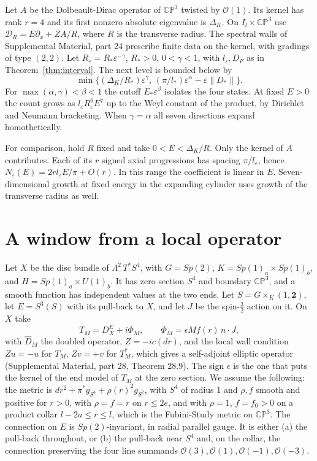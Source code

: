 \documentclass[aps,prd,reprint,onecolumn,nofootinbib,amsmath,amssymb,floatfix]{revtex4-2}
\theoremstyle{plain}
\newcommand{\CP}{\mathbb{CP}}
\newcommand{\hatD}{\widehat D}
\newcommand{\supp}[1]{Supplemental Material, part #1}
\begin{document}
Let $A$ be the Dolbeault-Dirac operator of $\CP^3$ twisted by $\mathcal O(1)$. Its kernel has rank $r=4$ and its first nonzero absolute eigenvalue is $\Delta_K$. On $I_l\times\CP^3$ use $\mathcal D_R=E\partial_x+ZA/R$, where $R$ is the transverse radius. The spectral walls of \supp{24} prescribe finite data on the kernel, with gradings of type $(2,2)$. Let $R_\varepsilon=R_*\varepsilon^{-\gamma}$, $R_*>0$, $0<\gamma<1$, with $l_\varepsilon,D_F$ as in Theorem~\ref{thm:interval}. The next level is bounded below by
\begin{equation}
\min\{(\Delta_K/R_*)\varepsilon^\gamma,\,
       (\pi/l_*)\varepsilon^\alpha-\varepsilon\|D_*\|\}.
\end{equation}
For $\max(\alpha,\gamma)<\beta<1$ the cutoff $E_*\varepsilon^\beta$ isolates the four states. At fixed $E>0$ the count grows as $l_\varepsilon R_\varepsilon^6 E^7$ up to the Weyl constant of the product, by Dirichlet and Neumann bracketing. When $\gamma=\alpha$ all seven directions expand homothetically.

For comparison, hold $R$ fixed and take $0<E<\Delta_K/R$. Only the kernel of $A$ contributes. Each of its $r$ signed axial progressions has spacing $\pi/l_\varepsilon$, hence $N_\varepsilon(E)=2r l_\varepsilon E/\pi+O(r)$. In this range the coefficient is linear in $E$. Seven-dimensional growth at fixed energy in the expanding cylinder uses growth of the transverse radius as well.

\section{A window from a local operator}\label{sec:window}

Let $X$ be the disc bundle of $\Lambda^2_-T^*S^4$, with $G=Sp(2)$, $K=Sp(1)_a\times Sp(1)_b$, and $H=Sp(1)_a\times U(1)_b$. It has zero section $S^4$ and boundary $\CP^3$, and a smooth function has independent values at the two ends. Let $S=G\times_K(1,\mathbf 2)$, let $E=S^3(S)$ with its pull-back to $X$, and let $J$ be the spin-$\frac32$ action on it. On $X$ take
\begin{equation}
T_M=D_X^E+i\Phi_M,\qquad\Phi_M=\epsilon Mf(r)\,n\cdot J,
\end{equation}
with $\hatD_M$ the doubled operator, $Z=-ic(dr)$, and the local wall condition $Zu=-u$ for $T_M$, $Zv=+v$ for $T_M^*$, which gives a self-adjoint elliptic operator (\supp{28}, Theorem 28.9). The sign $\epsilon$ is the one that puts the kernel of the end model of $T_M$ at the zero section. We assume the following: the metric is $dr^2+\pi^*g_{S^4}+\rho(r)^2g_{S^2}$, with $S^4$ of radius $1$ and $\rho,f$ smooth and positive for $r>0$, with $\rho=f=r$ on $r\le2e$, and with $\rho=1$, $f=f_0>0$ on a product collar $l-2a\le r\le l$, which is the Fubini-Study metric on $\CP^3$. The connection on $E$ is $Sp(2)$-invariant, in radial parallel gauge. It is either (a) the pull-back throughout, or (b) the pull-back near $S^4$ and, on the collar, the connection preserving the four line summands $\mathcal O(3),\mathcal O(1),\mathcal O(-1),\mathcal O(-3)$.
\end{document}
